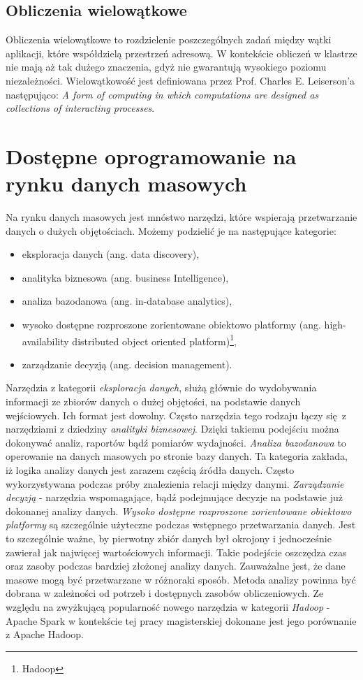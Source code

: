 \subsection{Obliczenia wielowątkowe}
Obliczenia wielowątkowe to rozdzielenie poszczególnych zadań między wątki aplikacji, które współdzielą przestrzeń adresową. W kontekście obliczeń w klastrze nie mają aż tak dużego znaczenia, gdyż nie gwarantują wysokiego poziomu niezależności. Wielowątkowość jest definiowana przez Prof. Charles E. Leiserson'a następująco: 
\newline \textit{A form of computing in which computations are designed as collections of interacting processes}\cite{mit_presentation}.
\section{Dostępne oprogramowanie na rynku danych masowych}
Na rynku danych masowych jest mnóstwo narzędzi, które wspierają przetwarzanie danych o dużych objętościach. Możemy podzielić je na następujące kategorie:
\begin{itemize}
	\item eksploracja danych (ang. data discovery),
	\item analityka biznesowa (ang. business Intelligence),
	\item analiza bazodanowa (ang. in-database analytics),
	\item wysoko dostępne rozproszone zorientowane obiektowo platformy (ang. high-availability distributed	object oriented platform)\footnote{Hadoop},
	\item zarządzanie decyzją (ang. decision management).    
\end{itemize}
Narzędzia z kategorii \textit{eksploracja danych}, służą głównie do wydobywania informacji ze zbiorów danych o dużej objętości, na podstawie danych wejściowych. Ich format jest dowolny. Często narzędzia tego rodzaju łączy się z narzędziami z dziedziny \textit{analityki biznesowej}. Dzięki takiemu podejściu można dokonywać analiz, raportów bądź pomiarów wydajności. \textit{Analiza bazodanowa} to operowanie na danych masowych po stronie bazy danych. Ta kategoria zakłada, iż logika analizy danych jest zarazem częścią źródła danych. Często wykorzystywana podczas próby znalezienia relacji między danymi. \textit{Zarządzanie decyzją} - narzędzia wspomagające, bądź podejmujące decyzje na podstawie już dokonanej analizy danych. \textit{Wysoko dostępne rozproszone zorientowane obiektowo platformy} są szczególnie użyteczne podczas wstępnego przetwarzania danych. Jest to szczególnie ważne, by pierwotny zbiór danych był okrojony i jednocześnie zawierał jak najwięcej wartościowych informacji. Takie podejście oszczędza czas oraz zasoby podczas bardziej złożonej analizy danych\cite{big_data_tools}.
\newline Zauważalne jest, że dane masowe mogą być przetwarzane w różnoraki sposób. Metoda analizy powinna być dobrana w zależności od potrzeb i dostępnych zasobów obliczeniowych. Ze względu na zwyżkującą popularność nowego narzędzia w kategorii \textit{Hadoop} - Apache Spark w kontekście tej pracy magisterskiej dokonane jest jego porównanie z Apache Hadoop\cite{databricks_survey}.  
